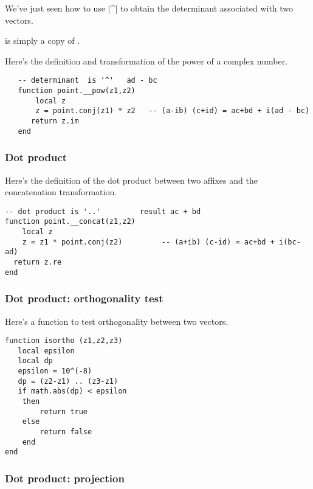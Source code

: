 We've just seen how to use |^| to obtain the determinant associated with two vectors. 

  is simply a copy of   .

Here's the definition and transformation of the power of a complex number.

\begin{Verbatim}
   -- determinant  is '^'   ad - bc
   function point.__pow(z1,z2)
       local z
       z = point.conj(z1) * z2   -- (a-ib) (c+id) = ac+bd + i(ad - bc)
      return z.im
   end
\end{Verbatim}


\subsubsection{Dot product} %
\label{ssub:scalar_product}

Here's the definition of the dot product between two affixes and the concatenation transformation. 

\begin{Verbatim}
-- dot product is '..'         result ac + bd
function point.__concat(z1,z2)
    local z
    z = z1 * point.conj(z2)         -- (a+ib) (c-id) = ac+bd + i(bc-ad) 
  return z.re
end
\end{Verbatim}



\subsubsection{Dot product: orthogonality test } %
\label{ssub:scalar_product_orthogonality_test}

Here's a function   to test orthogonality between two vectors.

\begin{Verbatim}
function isortho (z1,z2,z3)
   local epsilon
   local dp
   epsilon = 10^(-8)
   dp = (z2-z1) .. (z3-z1)
   if math.abs(dp) < epsilon 
    then 
        return true
    else 
        return false
    end
end
\end{Verbatim}


\subsubsection{Dot product: projection} %
\label{ssub:scalar_product_projection}

